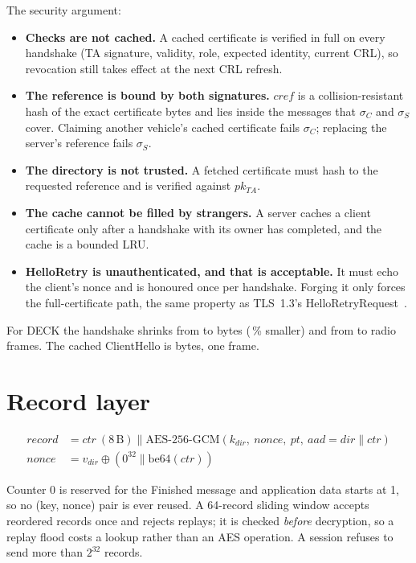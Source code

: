 The security argument:
\begin{itemize}
\item \textbf{Checks are not cached.} A cached certificate is verified in full
on every handshake (TA signature, validity, role, expected identity, current
CRL), so revocation still takes effect at the next CRL refresh.
\item \textbf{The reference is bound by both signatures.} $\mathit{cref}$ is
a collision-resistant hash of the exact certificate bytes and lies inside the
messages that $\sigma_C$ and $\sigma_S$ cover. Claiming another vehicle's
cached certificate fails $\sigma_C$; replacing the server's reference fails
$\sigma_S$.
\item \textbf{The directory is not trusted.} A fetched certificate must hash
to the requested reference and is verified against $pk_{TA}$.
\item \textbf{The cache cannot be filled by strangers.} A server caches a
client certificate only after a handshake with its owner has completed, and
the cache is a bounded LRU.
\item \textbf{HelloRetry is unauthenticated, and that is acceptable.} It must
echo the client's nonce and is honoured once per handshake. Forging it only
forces the full-certificate path, the same property as TLS~1.3's
HelloRetryRequest~\cite{tls13}.
\end{itemize}

For DECK the handshake shrinks from  to
 bytes (\,\% smaller) and from
 to  radio frames. The cached
ClientHello is  bytes, one frame.

\section{Record layer}

\begin{align*}
record &= ctr\ (8\,\mathrm{B}) \parallel \mathrm{AES\text{-}256\text{-}GCM}(k_{dir},\ nonce,\ pt,\ aad = dir \parallel ctr) \\
nonce &= v_{dir} \oplus (0^{32} \parallel \mathrm{be64}(ctr))
\end{align*}

Counter 0 is reserved for the Finished message and application data starts at
1, so no (key, nonce) pair is ever reused. A 64-record sliding window accepts
reordered records once and rejects replays; it is checked \emph{before}
decryption, so a replay flood costs a lookup rather than an AES operation. A
session refuses to send more than $2^{32}$ records.

